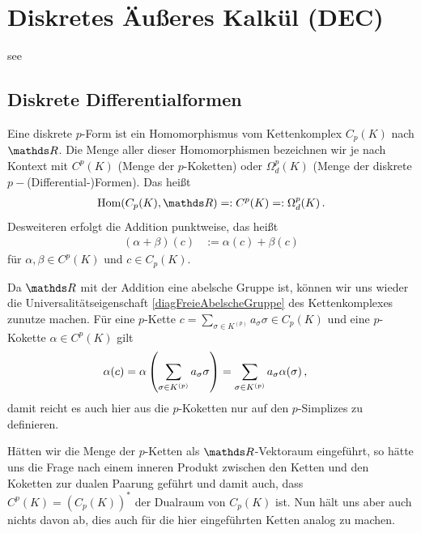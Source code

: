 \chapter{Diskretes Äußeres Kalkül (DEC)}
\label{chapterDEC}

see \cite{Lee} \cite{FirstCourse}

\section{Diskrete Differentialformen}
  
  \begin{definition}
    Eine diskrete \( p \)-Form ist ein Homomorphismus vom Kettenkomplex \( C_{p}(K) \) nach \( \R \).
    Die Menge aller dieser Homomorphismen bezeichnen wir je nach Kontext mit \( C^{p}(K) \) (Menge der \( p \)-Koketten)
    oder \( \Omega^{p}_{d}(K) \) (Menge der diskrete \( p- \)(Differential-)Formen). 
    Das heißt
    \begin{align}
      \hom(C_{p}(K),\R) =: C^{p}(K) =: \Omega^{p}_{d}(K) \formpunkt
    \end{align}
    Desweiteren erfolgt die Addition punktweise, das heißt
    \begin{align}
      \left( \alpha + \beta \right)(c) &:= \alpha(c) + \beta(c)
    \end{align}
    für \( \alpha,\beta \in C^{p}(K) \) und \( c \in C_{p}(K) \).
  \end{definition}
  
  \begin{folgerung}
    \label{folgUnikKoketten}
    Da \( \R \) mit der Addition eine abelsche Gruppe ist, können wir uns wieder die Universalitätseigenschaft \eqref{diagFreieAbelscheGruppe} des Kettenkomplexes zunutze machen.
    Für eine \( p \)-Kette \( c = \sum_{\sigma\in K^{(p)}} a_{\sigma} \sigma \in C_{p}(K)\) und eine  \( p \)-Kokette \( \alpha\in C^{p}(K) \) gilt
    \begin{align}
      \alpha(c) &= \alpha\left(\sum_{\sigma\in K^{(p)}} a_{\sigma} \sigma\right) = \sum_{\sigma\in K^{(p)}} a_{\sigma} \alpha(\sigma) \,\text{,}
    \end{align}
    damit reicht es auch hier aus die \( p \)-Koketten nur auf den \( p \)-Simplizes zu definieren.
  \end{folgerung}

  Hätten wir die Menge der \( p \)-Ketten als \( \R \)-Vektoraum eingeführt, so hätte uns die Frage nach einem inneren Produkt zwischen den Ketten und den Koketten zur dualen Paarung
  geführt und damit auch, dass \( C^{p}(K) = \left( C_{p}(K) \right)^{*}\) der Dualraum von \( C_{p}(K) \) ist.
  Nun hält uns aber auch nichts davon ab, dies auch für die hier eingeführten Ketten analog zu machen.

